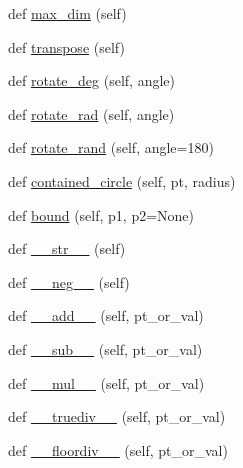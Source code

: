 \begin{DoxyCompactItemize}
def \mbox{\hyperlink{classpysc2_1_1lib_1_1point_1_1_point_ac8c600c87d5ddf4f8a99f6f2384fd6c4}{max\+\_\+dim}} (self)
\item 
def \mbox{\hyperlink{classpysc2_1_1lib_1_1point_1_1_point_a828601b4c3d0741500533b686bb5c568}{transpose}} (self)
\item 
def \mbox{\hyperlink{classpysc2_1_1lib_1_1point_1_1_point_a5bdafa1f2da49e32f27f02d107e5821b}{rotate\+\_\+deg}} (self, angle)
\item 
def \mbox{\hyperlink{classpysc2_1_1lib_1_1point_1_1_point_a09d54719a9479a72274471eea4c98c67}{rotate\+\_\+rad}} (self, angle)
\item 
def \mbox{\hyperlink{classpysc2_1_1lib_1_1point_1_1_point_ac97437cd53e34b7f194455bcb8b69140}{rotate\+\_\+rand}} (self, angle=180)
\item 
def \mbox{\hyperlink{classpysc2_1_1lib_1_1point_1_1_point_a2a9072cdc8c3270ced01cf5fa8d753b0}{contained\+\_\+circle}} (self, pt, radius)
\item 
def \mbox{\hyperlink{classpysc2_1_1lib_1_1point_1_1_point_a6197bb912bf6dbe571ee14e1c57712cd}{bound}} (self, p1, p2=None)
\item 
def \mbox{\hyperlink{classpysc2_1_1lib_1_1point_1_1_point_a445dca3f5b7104014b47f03cbcea42ef}{\+\_\+\+\_\+str\+\_\+\+\_\+}} (self)
\item 
def \mbox{\hyperlink{classpysc2_1_1lib_1_1point_1_1_point_ae25f9899f219532dbe222efe517b7059}{\+\_\+\+\_\+neg\+\_\+\+\_\+}} (self)
\item 
def \mbox{\hyperlink{classpysc2_1_1lib_1_1point_1_1_point_aa2c4361955cfd31c7068e32c1dbfe269}{\+\_\+\+\_\+add\+\_\+\+\_\+}} (self, pt\+\_\+or\+\_\+val)
\item 
def \mbox{\hyperlink{classpysc2_1_1lib_1_1point_1_1_point_a83651e9c66e17ae46fcc290beff409b7}{\+\_\+\+\_\+sub\+\_\+\+\_\+}} (self, pt\+\_\+or\+\_\+val)
\item 
def \mbox{\hyperlink{classpysc2_1_1lib_1_1point_1_1_point_a84699178ad3cfd1288f30eeeb0f99411}{\+\_\+\+\_\+mul\+\_\+\+\_\+}} (self, pt\+\_\+or\+\_\+val)
\item 
def \mbox{\hyperlink{classpysc2_1_1lib_1_1point_1_1_point_a26eef9dda4855ffd624391dd5d8b3e04}{\+\_\+\+\_\+truediv\+\_\+\+\_\+}} (self, pt\+\_\+or\+\_\+val)
\item 
def \mbox{\hyperlink{classpysc2_1_1lib_1_1point_1_1_point_ac75ec1bdb12721d3b44ba3f8183a5c07}{\+\_\+\+\_\+floordiv\+\_\+\+\_\+}} (self, pt\+\_\+or\+\_\+val)
\end{DoxyCompactItemize}


